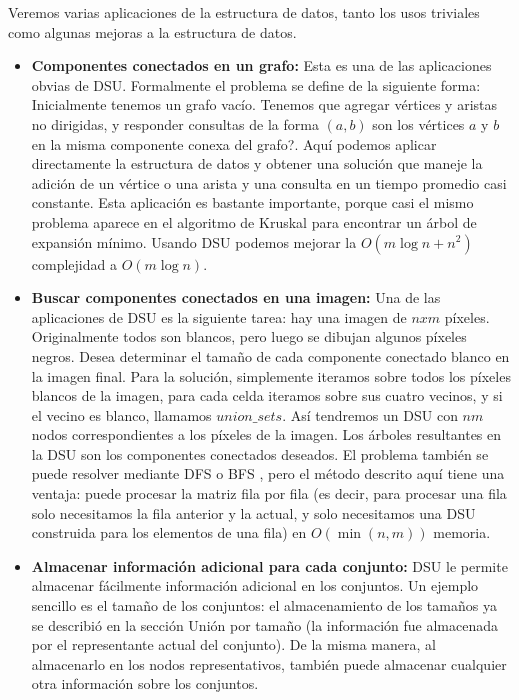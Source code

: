 Veremos varias aplicaciones de la estructura de datos, tanto los usos triviales como algunas mejoras a la estructura de datos.

\begin{itemize}
	\item \textbf{Componentes conectados en un grafo:} Esta es una de las aplicaciones obvias de DSU.
	 Formalmente el problema se define de la siguiente forma: Inicialmente tenemos un grafo vacío. 
	 Tenemos que agregar vértices y aristas no dirigidas, y responder consultas de la forma $(a,b)$ son los vértices $a$ y $b$ en la misma componente conexa del grafo?. Aquí podemos aplicar directamente la estructura de datos y obtener una solución que maneje la adición de un vértice o una arista y una consulta en un tiempo promedio casi constante. Esta aplicación es bastante importante, porque casi el mismo problema aparece en el algoritmo de Kruskal para encontrar un árbol de expansión mínimo. Usando DSU podemos mejorar la $O(m \log n + n^2)$ complejidad a $O(m \log n)$.
	 
	 \item \textbf{Buscar componentes conectados en una imagen:} Una de las aplicaciones de DSU es la siguiente tarea: hay una imagen de $nxm$ píxeles. Originalmente todos son blancos, pero 
	 luego se dibujan algunos píxeles negros. Desea determinar el tamaño de cada componente conectado blanco en la imagen final. Para la solución, simplemente iteramos sobre todos los píxeles blancos  de la imagen, para cada celda iteramos sobre sus cuatro vecinos, y si el vecino es blanco, llamamos $union\_sets$. Así tendremos un DSU con $nm$ nodos correspondientes a los píxeles de la imagen. Los árboles resultantes en la DSU son los componentes conectados deseados. El problema  también se puede resolver mediante DFS o BFS , pero el método descrito aquí tiene una ventaja: puede procesar la matriz fila por fila (es decir, para procesar una fila solo necesitamos la fila anterior y la actual, y solo necesitamos una DSU construida para los elementos de una fila) en $O(\min(n, m))$ memoria.
	 
	 \item \textbf{Almacenar información adicional para cada conjunto:} DSU le permite almacenar fácilmente información adicional en los conjuntos. Un ejemplo sencillo es el tamaño de los conjuntos: el almacenamiento de los tamaños ya se describió en la sección Unión por tamaño (la información fue almacenada por el representante actual del conjunto). De la misma manera, al almacenarlo en los nodos representativos, también puede almacenar cualquier otra información sobre los conjuntos.
	 

\end{itemize}
